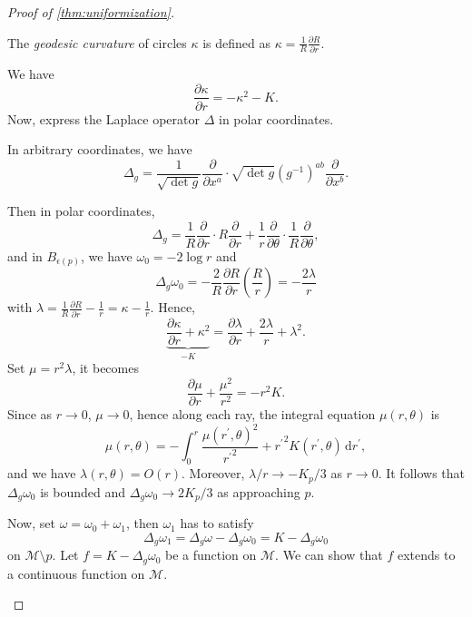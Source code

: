 \begin{proof}[Proof of \autoref{thm:uniformization}]
\begin{enumerate}
		      \begin{notation}
			      The \emph{geodesic curvature} of circles \(\kappa \) is defined as \(\kappa = \frac{1}{R} \frac{\partial R}{\partial r} \).
		      \end{notation}
		      We have
		      \[
			      \frac{\partial \kappa }{\partial r} = - \kappa ^2 - K.
		      \]
		      Now, express the Laplace operator \(\Delta \) in polar coordinates.

		      \begin{remark}
			      In arbitrary coordinates, we have
			      \[
				      \Delta _g = \frac{1}{\sqrt{\det g} } \frac{\partial }{\partial x^a} \cdot \sqrt{\det g} (g^{-1} )^{ab} \frac{\partial }{\partial x^b} .
			      \]
		      \end{remark}

		      Then in polar coordinates,
		      \[
			      \Delta _g = \frac{1}{R}\frac{\partial }{\partial r} \cdot R \frac{\partial }{\partial r} + \frac{1}{r}\frac{\partial }{\partial \theta } \cdot \frac{1}{R}\frac{\partial }{\partial \theta } ,
		      \]
		      and in \(B_{\epsilon (p)} \), we have \(\omega _0=-2\log r\) and
		      \[
			      \Delta _g \omega _0 = - \frac{2}{R} \frac{\partial R}{\partial r} \left( \frac{R}{r} \right) = - \frac{2\lambda }{r}
		      \]
		      with \(\lambda = \frac{1}{R} \frac{\partial R}{\partial r} - \frac{1}{r} = \kappa - \frac{1}{r}\). Hence,
		      \[
			      \underbrace{\frac{\partial \kappa }{\partial r} + \kappa ^2}_{-K } = \frac{\partial \lambda }{\partial r} + \frac{2\lambda }{r}+ \lambda ^2 .
		      \]
		      Set \(\mu = r^2 \lambda \), it becomes
		      \[
			      \frac{\partial \mu }{\partial r} + \frac{\mu ^2}{r^2} = -r^2 K.
		      \]
		      Since as \(r \to 0\), \(\mu \to 0\), hence along each ray, the integral equation \(\mu (r, \theta )\) is
		      \[
			      \mu (r, \theta )
			      = - \int_{0}^{r} \frac{\mu (r^{\prime} , \theta )^2}{{r^{\prime} }^2} + {r^{\prime} }^2 K (r^{\prime} , \theta )  \,\mathrm{d}r^{\prime},
		      \]
		      and we have \(\lambda (r, \theta ) = O(r)\). Moreover, \(\lambda / r \to - K_p / 3\) as \(r \to 0\). It follows that \(\Delta _g \omega _0\) is bounded and \(\Delta _g \omega _0 \to 2K_p / 3\) as approaching \(p\).

		      Now, set \(\omega = \omega _0 + \omega _1\), then \(\omega _1\) has to satisfy
		      \[
			      \Delta _g \omega _1
			      = \Delta _g \omega - \Delta _g \omega _0
			      = K - \Delta _g \omega _0
		      \]
		      on \(\mathcal{M} \setminus p\). Let \(f = K - \Delta _g \omega _0\) be a function on \(\mathcal{M} \). We can show that \(f\) extends to a continuous function on \(\mathcal{M} \).


\end{enumerate}
\end{proof}
